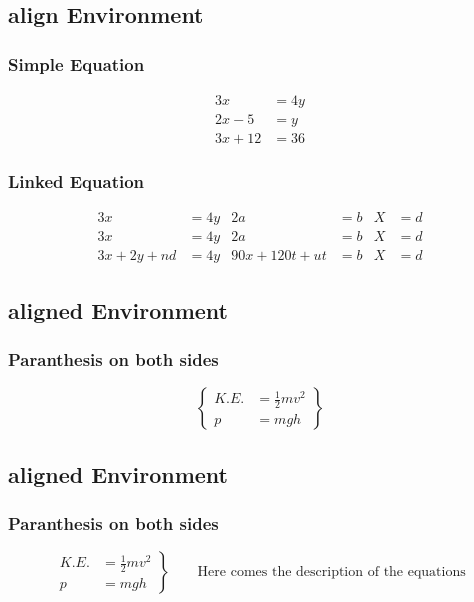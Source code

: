 \documentclass{article}
\begin{document}
	 	\subsection{align Environment}
	 		\subsubsection{Simple Equation}
	 			\begin{align}
	 	        	3x &= 4y \\
	 	        	2x-5 &= y \\
	 	    	    3x+12 &= 36 
	 	    	\end{align}
	 	
	 		\subsubsection{Linked Equation}
	 			\begin{align}
	 			3x &= 4y       &     2a&=b   &    X&=d \\
	 			3x &= 4y       &     2a&=b   &    X&=d \\
	 			3x +2y +nd &= 4y       &     90x + 120t + ut&=b   &    X&=d
	 			\end{align}
	 			
	 		\subsection{aligned Environment}
	 			\subsubsection{Paranthesis on both sides}
	 		 		\begin{equation}
	 		 			\left\{
	 		 			\begin{aligned}
	 		 			K.E. &= \frac{1}{2}mv^2 \\
	 		 			p &= mgh 
	 		 			\end{aligned}
	 		 			\right	\}
	 		 		\end{equation}
	 		 		
	 		 		
	 		 		
	 		\subsection{aligned Environment}
	 		 	\subsubsection{Paranthesis on both sides}
	 		 	\begin{equation}
	 		 	\left.
	 		 	\begin{aligned}
	 		 	K.E. &= \frac{1}{2}mv^2 \\
	 		 	p &= mgh 
	 		 	\end{aligned}
	 		 	\right	\}
	 		 	\qquad \text{Here comes the description of the equations}
	 		 \end{equation}
	 		
\end{document}
